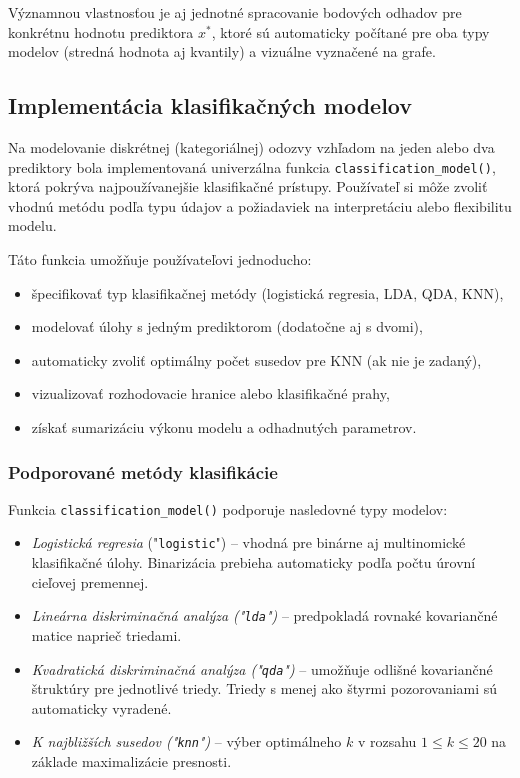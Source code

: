 Významnou vlastnosťou je aj jednotné spracovanie bodových odhadov pre konkrétnu hodnotu prediktora $x^*$, ktoré sú automaticky počítané pre oba typy modelov (stredná hodnota aj kvantily) a vizuálne vyznačené na grafe.


\subsection{Implementácia klasifikačných modelov}\label{subsec:classification_implementation}

Na modelovanie diskrétnej (kategoriálnej) odozvy vzhľadom na jeden alebo dva prediktory bola implementovaná univerzálna funkcia \texttt{classification\_model()}, ktorá pokrýva najpoužívanejšie klasifikačné prístupy. Používateľ si môže zvoliť vhodnú metódu podľa typu údajov a požiadaviek na interpretáciu alebo flexibilitu modelu.

Táto funkcia umožňuje používateľovi jednoducho:

\begin{itemize}
  \item špecifikovať typ klasifikačnej metódy (logistická regresia, LDA, QDA, KNN),
  \item modelovať úlohy s jedným prediktorom (dodatočne aj s dvomi),
  \item automaticky zvoliť optimálny počet susedov pre KNN (ak nie je zadaný),
  \item vizualizovať rozhodovacie hranice alebo klasifikačné prahy,
  \item získať sumarizáciu výkonu modelu a odhadnutých parametrov.
\end{itemize}

\subsubsection{Podporované metódy klasifikácie}

Funkcia \texttt{classification\_model()} podporuje nasledovné typy modelov:

\begin{itemize}
  \item \textit{Logistická regresia} ("\texttt{logistic}") – vhodná pre binárne aj multinomické klasifikačné úlohy. Binarizácia prebieha automaticky podľa počtu úrovní cieľovej premennej.
  \item \textit{Lineárna diskriminačná analýza ("\texttt{lda}")} – predpokladá rovnaké kovariančné matice naprieč triedami.
  \item \textit{Kvadratická diskriminačná analýza ("\texttt{qda}")} – umožňuje odlišné kovariančné štruktúry pre jednotlivé triedy. Triedy s menej ako štyrmi pozorovaniami sú automaticky vyradené.
  \item \textit{K najbližších susedov ("\texttt{knn}")} – výber optimálneho $k$ v rozsahu $1 \leq k \leq 20$ na základe maximalizácie presnosti.
\end{itemize}

